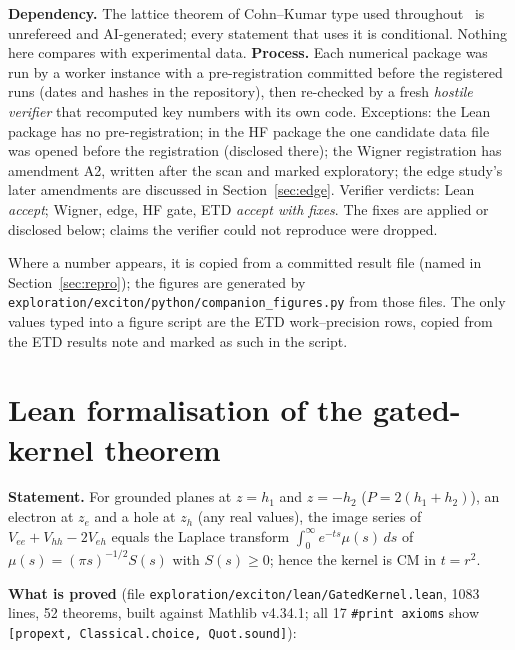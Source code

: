 \documentclass[11pt,a4paper]{article}
\begin{document}
\begin{keybox}
\textbf{Dependency.} The lattice theorem of Cohn--Kumar type used throughout~\cite{OpenAI2026,CohnKumar2007} is unrefereed and
AI-generated; every statement that uses it is conditional. Nothing here compares with experimental data.
\textbf{Process.} Each numerical package was run by a worker instance with a pre-registration committed before the registered runs
(dates and hashes in the repository), then re-checked by a fresh \emph{hostile verifier} that recomputed key numbers with its own code.
Exceptions: the Lean package has no pre-registration; in the HF package the one candidate data file was opened before the registration
(disclosed there); the Wigner registration has amendment A2, written after the scan and marked exploratory; the edge study's later
amendments are discussed in Section~\ref{sec:edge}.
Verifier verdicts: Lean \emph{accept}; Wigner, edge, HF gate, ETD \emph{accept with fixes}. The fixes are applied or disclosed below;
claims the verifier could not reproduce were dropped.
\end{keybox}

Where a number appears, it is copied from a committed result file (named in Section~\ref{sec:repro}); the figures are generated by
\texttt{exploration/exciton/python/companion\_figures.py} from those files. The only values typed into a figure script are the ETD
work--precision rows, copied from the ETD results note and marked as such in the script.

\section{Lean formalisation of the gated-kernel theorem}\label{sec:lean}

\textbf{Statement.} For grounded planes at $z=h_1$ and $z=-h_2$ ($P=2(h_1+h_2)$), an electron at $z_e$ and a hole at $z_h$ (any real
values), the image series of $V_{ee}+V_{hh}-2V_{eh}$ equals the Laplace transform $\int_0^\infty e^{-ts}\mu(s)\,ds$ of
$\mu(s)=(\pi s)^{-1/2}S(s)$ with $S(s)\ge 0$; hence the kernel is CM in $t=r^2$.

\textbf{What is proved} (file \texttt{exploration/exciton/lean/GatedKernel.lean}, 1083 lines, 52 theorems, built against Mathlib
v4.34.1; all 17 \texttt{\#print axioms} show \texttt{[propext, Classical.choice, Quot.sound]}):
\end{document}
